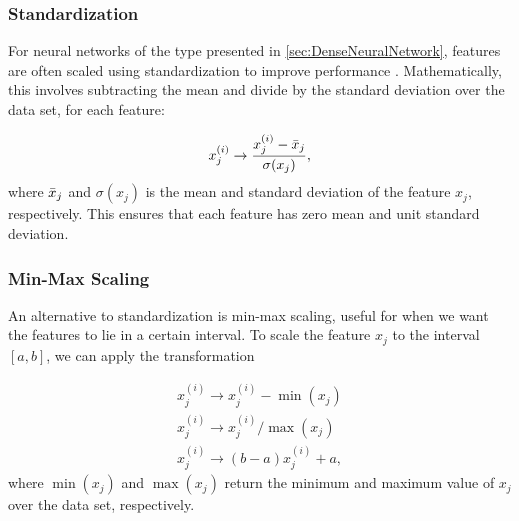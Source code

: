 \subsubsection*{Standardization}
For neural networks of the type presented in \autoref{sec:DenseNeuralNetwork}, features are often scaled using standardization to improve performance \cite{LeCun2012}. Mathematically, this involves subtracting the mean and divide by the standard deviation over the data set, for each feature:

\begin{equation}
    x_j^{(i)} \rightarrow \frac{x_j^{(i)} - \Bar{x}_j}{\sigma(x_j)},
\end{equation}
where $\Bar{x}_j$ and $\sigma(x_j)$ is the mean and standard deviation of the feature $x_j$, respectively. This ensures that each feature has zero mean and unit standard deviation.

\subsubsection*{Min-Max Scaling}
An alternative to standardization is min-max scaling, useful for when we want the features to lie in a certain interval. To scale the feature $x_j$ to the interval $[a, b]$, we can apply the transformation

\begin{equation}
\begin{aligned}
    x_j^{(i)} \rightarrow x_j^{(i)} - \min(x_j)\\
    x_j^{(i)} \rightarrow x_j^{(i)}/\max(x_j)\\ 
    x_j^{(i)} \rightarrow (b-a) x_j^{(i)} + a,
\end{aligned}  
\end{equation}
where $\min(x_j)$ and $\max(x_j)$ return the minimum and maximum value of $x_j$ over the data set, respectively.

